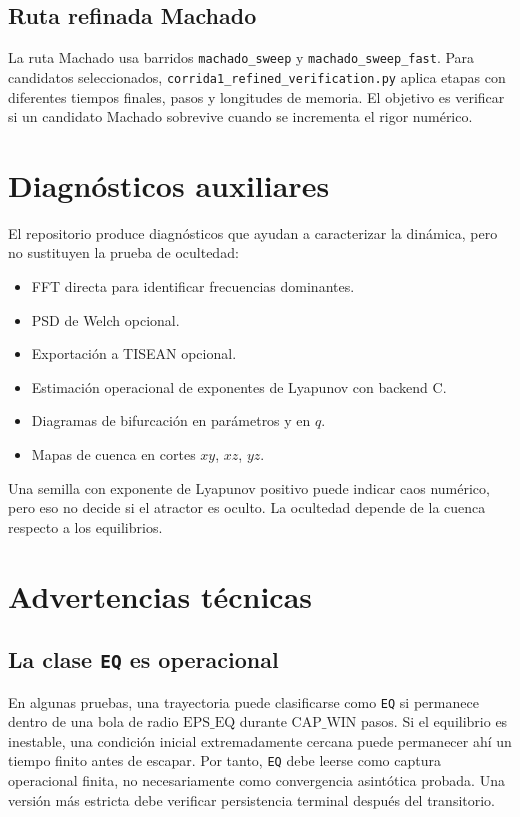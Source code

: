 \documentclass[11pt]{article}
\begin{document}
\subsection{Ruta refinada Machado}

La ruta Machado usa barridos \texttt{machado\_sweep} y \texttt{machado\_sweep\_fast}. Para candidatos seleccionados, \texttt{corrida1\_refined\_verification.py} aplica etapas con diferentes tiempos finales, pasos y longitudes de memoria. El objetivo es verificar si un candidato Machado sobrevive cuando se incrementa el rigor numérico.

\section{Diagnósticos auxiliares}

El repositorio produce diagnósticos que ayudan a caracterizar la dinámica, pero no sustituyen la prueba de ocultedad:
\begin{itemize}
\item FFT directa para identificar frecuencias dominantes.
\item PSD de Welch opcional.
\item Exportación a TISEAN opcional.
\item Estimación operacional de exponentes de Lyapunov con backend C.
\item Diagramas de bifurcación en parámetros y en \(q\).
\item Mapas de cuenca en cortes \(xy\), \(xz\), \(yz\).
\end{itemize}
Una semilla con exponente de Lyapunov positivo puede indicar caos numérico, pero eso no decide si el atractor es oculto. La ocultedad depende de la cuenca respecto a los equilibrios.

\section{Advertencias técnicas}

\subsection{La clase \texttt{EQ} es operacional}

En algunas pruebas, una trayectoria puede clasificarse como \texttt{EQ} si permanece dentro de una bola de radio \(\mathrm{EPS\_EQ}\) durante \(\mathrm{CAP\_WIN}\) pasos. Si el equilibrio es inestable, una condición inicial extremadamente cercana puede permanecer ahí un tiempo finito antes de escapar. Por tanto, \texttt{EQ} debe leerse como captura operacional finita, no necesariamente como convergencia asintótica probada. Una versión más estricta debe verificar persistencia terminal después del transitorio.
\end{document}
